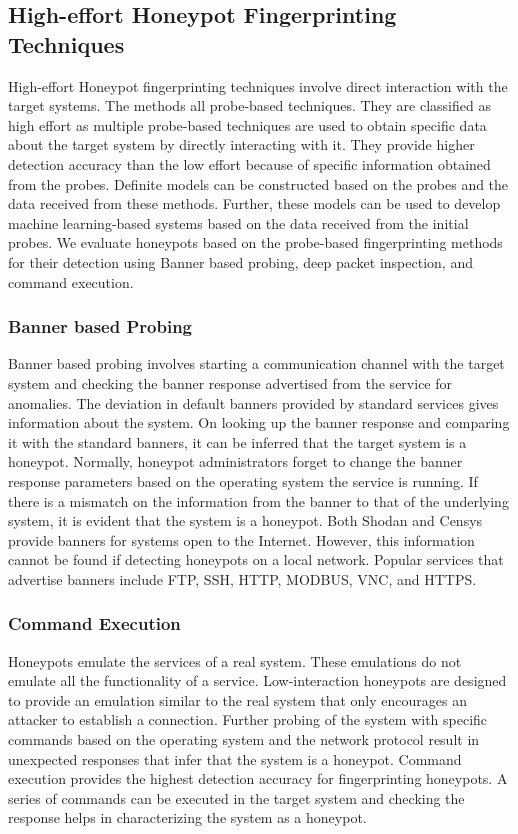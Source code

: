 \subsection{High-effort Honeypot Fingerprinting Techniques}
High-effort Honeypot fingerprinting techniques involve direct interaction with the target systems. The methods all probe-based techniques. They are classified as high effort as multiple probe-based techniques are used to obtain specific data about the target system by directly interacting with it. They provide higher detection accuracy than the low effort because of specific information obtained from the probes. Definite models can be constructed based on the probes and the data received from these methods. Further, these models can be used to develop machine learning-based systems based on the data received from the initial probes. We evaluate honeypots based on the probe-based fingerprinting methods for their detection using Banner based probing, deep packet inspection, and command execution.

\subsubsection{Banner based Probing}
Banner based probing involves starting a communication channel with the target system and checking the banner response advertised from the service for anomalies. The deviation in default banners provided by standard services gives information about the system. On looking up the banner response and comparing it with the standard banners, it can be inferred that the target system is a honeypot. Normally, honeypot administrators forget to change the banner response parameters based on the operating system the service is running. If there is a mismatch on the information from the banner to that of the underlying system, it is evident that the system is a honeypot. Both Shodan and Censys provide banners for systems open to the Internet. However, this information cannot be found if detecting honeypots on a local network. Popular services that advertise banners include FTP, SSH, HTTP, MODBUS, VNC, and HTTPS. 


\subsubsection{Command Execution}
Honeypots emulate the services of a real system. These emulations do not emulate all the functionality of a service. Low-interaction honeypots are designed to provide an emulation similar to the real system that only encourages an attacker to establish a connection. Further probing of the system with specific commands based on the operating system and the network protocol result in unexpected responses that infer that the system is a honeypot. Command execution provides the highest detection accuracy for fingerprinting honeypots. A series of commands can be executed in the target system and checking the response helps in characterizing the system as a honeypot. 



